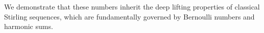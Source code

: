 \documentclass[12pt]{amsart}
\newtheorem{theorem}{Theorem}[section]
\theoremstyle{definition}
\begin{document}
%
%
We demonstrate that these numbers inherit the deep lifting properties of classical Stirling sequences, which are fundamentally governed by Bernoulli numbers and harmonic sums.
\end{document}
